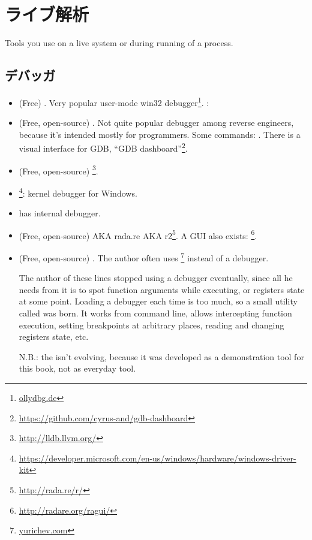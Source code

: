 \section{ライブ解析}

Tools you use on a live system or during running of a process.

\subsection{デバッガ}

\myindex{\olly}

\begin{itemize}
\item (Free) .
Very popular user-mode win32 debugger\footnote{\href{http://go.yurichev.com/17032}{ollydbg.de}}.
\ShortHotKeyCheatsheet: 

\item (Free, open-source) .
Not quite popular debugger among reverse engineers, because it's intended mostly for programmers.
Some commands: .
There is a visual interface for GDB, ``GDB dashboard''\footnote{\url{https://github.com/cyrus-and/gdb-dashboard}}.

\item (Free, open-source) \footnote{\url{http://lldb.llvm.org/}}.

\item {}\footnote{\url{https://developer.microsoft.com/en-us/windows/hardware/windows-driver-kit}}:
kernel debugger for Windows.

\item {} has internal debugger.

\item (Free, open-source)  \ac{AKA} rada.re \ac{AKA} r2\footnote{\url{http://rada.re/r/}}.
A GUI also exists: \footnote{\url{http://radare.org/ragui/}}.

\item (Free, open-source) .
\label{tracer}
The author often uses 
\footnote{\href{http://go.yurichev.com/17338}{yurichev.com}}
instead of a debugger.

The author of these lines stopped using a debugger eventually, since all he needs from it is to spot function arguments while
executing, or registers state at some point.
Loading a debugger each time is too much, so a small utility called  was born.
It works from command line, allows intercepting function execution,
setting breakpoints at arbitrary places, reading and changing registers state, etc.

N.B.: the  isn't evolving, because it was developed as a demonstration tool for this book, not as everyday tool.
\end{itemize}

